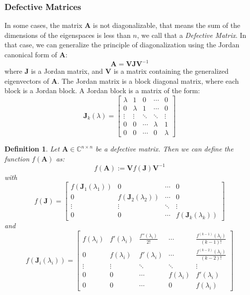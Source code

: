 \documentclass[11pt]{article}
\newtheorem{definition}{Definition}
\numberwithin{equation}{section}
\begin{document}
\subsubsection*{Defective Matrices}
In some cases, the matrix $\mathbf{A}$ is not diagonalizable, that means the sum of the dimensions of the eigenspaces is less than $n$, we call that a \textit{Defective Matrix}. In that case, we can generalize the principle of diagonalization using the Jordan canonical form of $\mathbf{A}$:
\begin{equation}
    \mathbf{A} = \mathbf{V}\mathbf{J}\mathbf{V}^{-1}
\end{equation}
where $\mathbf{J}$ is a Jordan matrix, and $\mathbf{V}$ is a matrix containing the generalized eigenvectors of $\mathbf{A}$. The Jordan matrix is a block diagonal matrix, where each block is a Jordan block. A Jordan block is a matrix of the form:
\begin{equation}
    \mathbf{J}_k(\lambda) = \begin{bmatrix}
        \lambda & 1 & 0 & \cdots & 0 \\
        0 & \lambda & 1 & \cdots & 0 \\
        \vdots & \vdots & \ddots & \ddots & \vdots \\
        0 & 0 & \cdots & \lambda & 1 \\
        0 & 0 & \cdots & 0 & \lambda
    \end{bmatrix}
\end{equation}
\begin{definition}\label{thm:jordan}
    Let $\mathbf{A}\in\mathbb{C}^{n\times n}$ be a defective matrix. Then we can define the function $f(\mathbf{A})$ as:
    \begin{equation}
        f(\mathbf{A}) := \mathbf{V}f(\mathbf{J})\mathbf{V}^{-1}
    \end{equation}
    with 
    \begin{equation}
        f(\mathbf{J}) = \begin{bmatrix}
            f(\mathbf{J}_1(\lambda_1)) & 0 & \cdots & 0 \\
            0 & f(\mathbf{J}_2(\lambda_2)) & \cdots & 0 \\
            \vdots & \vdots & \ddots & \vdots \\
            0 & 0 & \cdots & f(\mathbf{J}_k(\lambda_k))
        \end{bmatrix}
    \end{equation}
    and \begin{equation}
        f(\mathbf{J}_i(\lambda_i)) = \begin{bmatrix}
            f(\lambda_i) & f'(\lambda_i) & \frac{f''(\lambda_i)}{2!} & \cdots & \frac{f^{(k-1)}(\lambda_i)}{(k-1)!} \\
            0 & f(\lambda_i) & f'(\lambda_i) & \cdots & \frac{f^{(k-2)}(\lambda_i)}{(k-2)!} \\
            \vdots & \vdots & \ddots & \ddots & \vdots \\
            0 & 0 & \cdots & f(\lambda_i) & f'(\lambda_i) \\
            0 & 0 & \cdots & 0 & f(\lambda_i)
        \end{bmatrix}
    \end{equation}
\end{definition}
\end{document}
